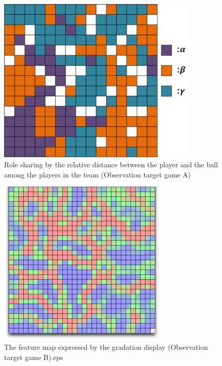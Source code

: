 \begin{figure}[htb]
  \begin{center}
    \includegraphics[clip,height=8.0cm]{figure/Role_sharing_by_the_relative_distance_between_the_player_and_the_ball_among_the_players_in_the_team_Observation_target_game_A.eps}
    \caption{Role sharing by the relative distance between the player and the ball among the players in the team (Observation target game A)}
    \label{fig:SOM_result02}
  \end{center}
\end{figure}

\begin{figure}[htb]
  \begin{center}
    \includegraphics[clip,height=8.0cm]{figure/The_feature_map_expressed_by_the_gradation_display_Observation_target_game_B.eps}
    \caption{The feature map expressed by the gradation display (Observation target game B).eps}
    \label{fig:SOM_result03}
  \end{center}
\end{figure}

